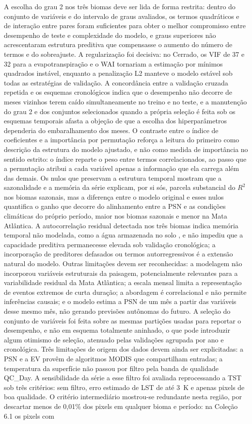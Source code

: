 \documentclass[a4paper,fleqn]{cas-sc}
\begin{document}
A escolha do grau 2 nos três biomas deve ser lida de forma restrita: dentro do conjunto de variáveis e do intervalo de graus avaliados, os termos quadráticos e de interação entre pares foram suficientes para obter o melhor compromisso entre desempenho de teste e complexidade do modelo, e graus superiores não acrescentaram estrutura preditiva que compensasse o aumento do número de termos e do sobreajuste. A regularização foi decisiva: no Cerrado, os VIF de 37 e 32 para a evapotranspiração e o WAI tornariam a estimação por mínimos quadrados instável, enquanto a penalização L2 manteve o modelo estável sob todas as estratégias de validação. A concordância entre a validação cruzada repetida e os esquemas cronológicos indica que o desempenho não decorre de meses vizinhos terem caído simultaneamente no treino e no teste, e a manutenção do grau 2 e dos conjuntos selecionados quando a própria seleção é feita sob os esquemas temporais afasta a objeção de que a escolha dos hiperparâmetros dependeria do embaralhamento dos meses. O contraste entre o índice de coeficientes e a importância por permutação reforça a leitura do primeiro como descrição da estrutura do modelo ajustado, e não como medida de importância no sentido estrito: o índice reparte o peso entre termos correlacionados, ao passo que a permutação atribui a cada variável apenas a informação que ela carrega além das demais. Os nulos que preservam a estrutura temporal mostram que a sazonalidade e a memória da série explicam, por si sós, parcela substancial do $R^2$ nos biomas sazonais, mas a diferença entre o modelo original e esses nulos quantifica o ganho que decorre do alinhamento entre a PSN e as condições climáticas do próprio período, maior nos biomas sazonais e menor na Mata Atlântica. A autocorrelação residual detectada nos três biomas indica memória temporal não modelada, como a água armazenada no solo \citep{oliveira2005}, e não impediu que a capacidade preditiva permanecesse elevada sob validação cronológica; a incorporação de preditores defasados ou termos autorregressivos é a extensão natural do modelo. Outras limitações devem ser reconhecidas: a modelagem não incorporou variáveis estruturais da paisagem, potencialmente relevantes para a variabilidade residual da Mata Atlântica; a escala mensal limita a representação de eventos extremos de curta duração; a abordagem é correlacional e não permite inferências causais; e o modelo estima a PSN de um mês a partir das variáveis desse mesmo mês, não gerando previsões autônomas do futuro. A seleção do conjunto de variáveis foi feita sobre as mesmas partições usadas para reportar o desempenho, e não em esquema totalmente aninhado, o que pode introduzir algum otimismo de seleção, atenuado pelas validações agrupada por ano e cronológica. Três limitações de origem dos dados devem ainda ser explicitadas: a PSN e a EV provêm de algoritmos MODIS que compartilham entradas; a temperatura da superfície não passou por filtro pela banda de qualidade QC\_Day. A sensibilidade da série a esse filtro foi avaliada reprocessando a TST sob três critérios: sem filtro, erro estimado de LST de até 3~K e apenas pixels de boa qualidade. O critério intermediário mostrou-se redundante nesta região, por descartar menos de 0,01\% dos pixels em qualquer bioma e período: na Coleção 6.1 os pixels com 
\end{document}
